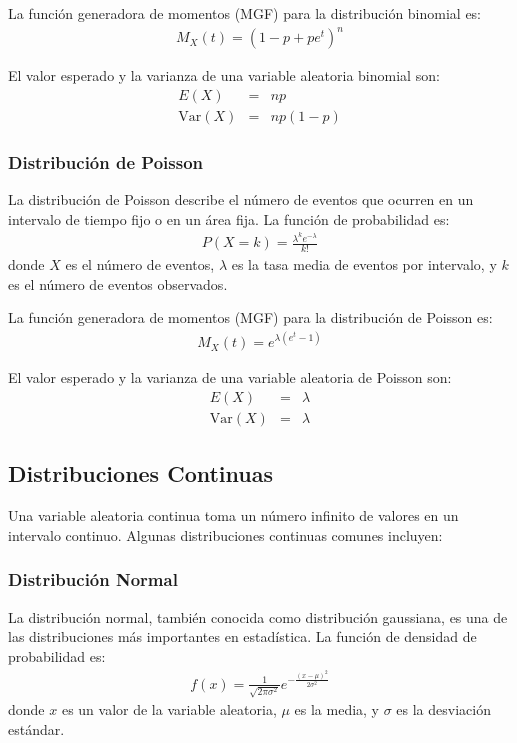 \documentclass[a4paper]{report} %
\begin{document}
La funci\'on generadora de momentos (MGF) para la distribuci\'on binomial es:
\begin{eqnarray*}
M_X(t) = \left( 1 - p + pe^t \right)^n
\end{eqnarray*}

El valor esperado y la varianza de una variable aleatoria binomial son:
\begin{eqnarray*}
E(X) &=& np \\
\text{Var}(X) &=& np(1-p)
\end{eqnarray*}

\subsubsection{Distribuci\'on de Poisson}

La distribuci\'on de Poisson describe el n\'umero de eventos que ocurren en un intervalo de tiempo fijo o en un \'area fija. La funci\'on de probabilidad es:
\begin{eqnarray*}
P(X = k) = \frac{\lambda^k e^{-\lambda}}{k!}
\end{eqnarray*}
donde $X$ es el n\'umero de eventos, $\lambda$ es la tasa media de eventos por intervalo, y $k$ es el n\'umero de eventos observados.

La funci\'on generadora de momentos (MGF) para la distribuci\'on de Poisson es:
\begin{eqnarray*}
M_X(t) = e^{\lambda (e^t - 1)}
\end{eqnarray*}

El valor esperado y la varianza de una variable aleatoria de Poisson son:
\begin{eqnarray*}
E(X) &=& \lambda \\
\text{Var}(X) &=& \lambda
\end{eqnarray*}

\subsection{Distribuciones Continuas}

Una variable aleatoria continua toma un n\'umero infinito de valores en un intervalo continuo. Algunas distribuciones continuas comunes incluyen:

\subsubsection{Distribuci\'on Normal}

La distribuci\'on normal, tambi\'en conocida como distribuci\'on gaussiana, es una de las distribuciones m\'as importantes en estad\'istica. La funci\'on de densidad de probabilidad es:
\begin{eqnarray*}
f(x) = \frac{1}{\sqrt{2\pi\sigma^2}} e^{-\frac{(x-\mu)^2}{2\sigma^2}}
\end{eqnarray*}
donde $x$ es un valor de la variable aleatoria, $\mu$ es la media, y $\sigma$ es la desviaci\'on est\'andar.
\end{document}
